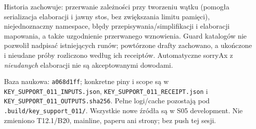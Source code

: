 \documentclass[11pt,a4paper]{article}
\newcommand{\code}[1]{\nolinkurl{#1}}
\begin{document}
Historia zachowuje: przerwanie zależności przy tworzeniu wątku (pomogła
serializacja elaboracji i jawny stos, bez zwiększania limitu pamięci),
niejednoznaczny namespace, błędy przepisywania/simplifikacji i elaboracji
mapowania, a także uzgodnienie przerwanego wznowienia. Guard katalogów
nie pozwolił nadpisać istniejących runów; powtórzone drafty zachowano,
a ukończone i nieudane próby rozliczono według ich receiptów.
Automatyczne sorryAx z \emph{nieudanych} elaboracji nie są akceptowanymi dowodami.

Baza naukowa: \code{a068d1ff}; konkretne piny i scope są w
\code{KEY_SUPPORT_011_INPUTS.json}, \code{KEY_SUPPORT_011_RECEIPT.json}
i \code{KEY_SUPPORT_011_OUTPUTS.sha256}. Pełne logi/cache pozostają pod
\code{.build/key_support_011/}. Wszystkie nowe źródła są w S05 development.
Nie zmieniono T12.1/B20, mainline, paperu ani strony; bez push tej sesji.
\end{document}
